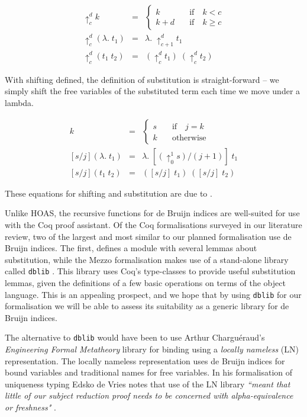 \documentclass[]{unswthesis}
\newcommand{\SSPHS}{\text{SSPHS }}
\begin{document}
\begin{eqnarray*}
\uparrow^d_c k & = &
	\begin{cases}
	k \quad & \text{if} \quad k < c \\
	k + d \quad & \text{if} \quad k \geq c
	\end{cases}\\
\uparrow^d_c (\lambda. \; t_1) & = & \lambda. \; \uparrow^d_{c + 1} t_1\\
\uparrow^d_c (t_1 \; t_2) & = & (\uparrow^d_c t_1) \; (\uparrow^d_c t_2)
\end{eqnarray*}

With shifting defined, the definition of substitution is straight-forward -- we simply shift the free variables of the substituted term each time we move under a lambda.

\begin{eqnarray*}
[s/j]k & = &
	\begin{cases}
	s \quad & \text{if} \quad j = k \\
	k \quad & \text{otherwise}
	\end{cases}\\
\left[s/j\right](\lambda. \; t_1) & = & \lambda. \; [(\uparrow^1_0 s)/(j + 1)] \; t_1\\
\left[s/j\right](t_1 \; t_2) & = & ([s/j] \; t_1) \; ([s/j] \; t_2)
\end{eqnarray*}

These equations for shifting and substitution are due to \cite{tapl}.

Unlike HOAS, the recursive functions for de Bruijn indices are well-suited for use with the Coq proof assistant. Of the Coq formalisations surveyed in our literature review, two of the largest and most similar to our planned formalisation use de Bruijn indices. The first, \SSPHS \cite{pottier13} defines a module with several lemmas about substitution, while the Mezzo formalisation \cite{mezzo14} makes use of a stand-alone library called \texttt{dblib} \cite{dblib13}. This library uses Coq's type-classes to provide useful substitution lemmas, given the definitions of a few basic operations on terms of the object language. This is an appealing prospect, and we hope that by using \texttt{dblib} for our formalisation we will be able to assess its suitability as a generic library for de Bruijn indices.

The alternative to \texttt{dblib} would have been to use Arthur Chargu\'{e}raud's \textit{Engineering Formal Metatheory} library \cite{aydemir08} for binding using a \textit{locally nameless} (LN) representation. The locally nameless representation uses de Bruijn indices for bound variables and traditional names for free variables. In his formalisation of uniqueness typing Edsko de Vries notes that use of the LN library \textit{``meant that little of our subject reduction proof needs to be concerned with alpha-equivalence or freshness"} \cite{deVries07}.
\end{document}

